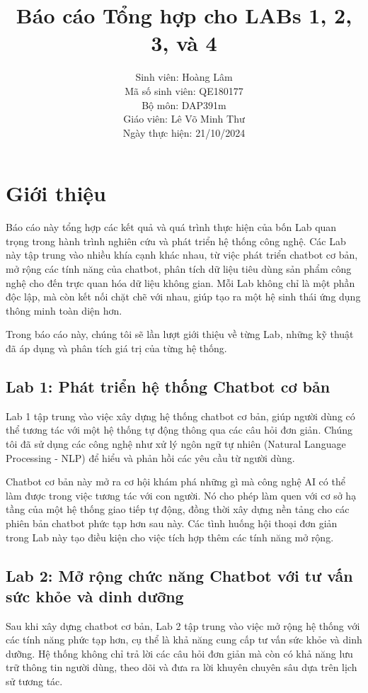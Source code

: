 \documentclass[a4paper,12pt]{report}
\title{Báo cáo Tổng hợp cho LABs 1, 2, 3, và 4}
\author{Sinh viên: Hoàng Lâm \\
Mã số sinh viên: QE180177 \\
Bộ môn: DAP391m \\
Giáo viên: Lê Võ Minh Thư \\
Ngày thực hiện: 21/10/2024}
\date{}
\begin{document}
\maketitle  %

\tableofcontents  %

\chapter{Giới thiệu}
Báo cáo này tổng hợp các kết quả và quá trình thực hiện của bốn Lab quan trọng trong hành trình nghiên cứu và phát triển hệ thống công nghệ. Các Lab này tập trung vào nhiều khía cạnh khác nhau, từ việc phát triển chatbot cơ bản, mở rộng các tính năng của chatbot, phân tích dữ liệu tiêu dùng sản phẩm công nghệ cho đến trực quan hóa dữ liệu không gian. Mỗi Lab không chỉ là một phần độc lập, mà còn kết nối chặt chẽ với nhau, giúp tạo ra một hệ sinh thái ứng dụng thông minh toàn diện hơn. 

Trong báo cáo này, chúng tôi sẽ lần lượt giới thiệu về từng Lab, những kỹ thuật đã áp dụng và phân tích giá trị của từng hệ thống.

\section{Lab 1: Phát triển hệ thống Chatbot cơ bản}
Lab 1 tập trung vào việc xây dựng hệ thống chatbot cơ bản, giúp người dùng có thể tương tác với một hệ thống tự động thông qua các câu hỏi đơn giản. Chúng tôi đã sử dụng các công nghệ như xử lý ngôn ngữ tự nhiên (Natural Language Processing - NLP) để hiểu và phản hồi các yêu cầu từ người dùng.

Chatbot cơ bản này mở ra cơ hội khám phá những gì mà công nghệ AI có thể làm được trong việc tương tác với con người. Nó cho phép làm quen với cơ sở hạ tầng của một hệ thống giao tiếp tự động, đồng thời xây dựng nền tảng cho các phiên bản chatbot phức tạp hơn sau này. Các tình huống hội thoại đơn giản trong Lab này tạo điều kiện cho việc tích hợp thêm các tính năng mở rộng.

\section{Lab 2: Mở rộng chức năng Chatbot với tư vấn sức khỏe và dinh dưỡng}
Sau khi xây dựng chatbot cơ bản, Lab 2 tập trung vào việc mở rộng hệ thống với các tính năng phức tạp hơn, cụ thể là khả năng cung cấp tư vấn sức khỏe và dinh dưỡng. Hệ thống không chỉ trả lời các câu hỏi đơn giản mà còn có khả năng lưu trữ thông tin người dùng, theo dõi và đưa ra lời khuyên chuyên sâu dựa trên lịch sử tương tác.
\end{document}
